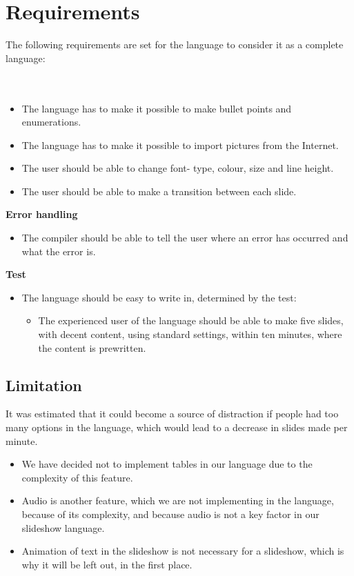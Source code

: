 \section{Requirements}
\label{LanguageRequirements}
The following requirements are set for the language to consider it as a complete language:
\\ \\
 \\
\begin{itemize}
\item The language has to make it possible to make bullet points and enumerations.
\item The language has to make it possible to import pictures from the Internet.
\item The user should be able to change font- type, colour, size and line height.
\item The user should be able to make a transition between each slide. 
\end{itemize}
\textbf{Error handling}\\
\begin{itemize}
\item The compiler should be able to tell the user where an error has occurred and what the error is.
\end{itemize}
\textbf{Test}\\
\begin{itemize}
\item The language should be easy to write in, determined by the test:
\begin{itemize}
\item The experienced user of the language should be able to make five slides, with decent content, using standard settings, within ten minutes, where the content is prewritten.
\end{itemize}
\end{itemize}

\subsection*{Limitation}
It was estimated that it could become a source of distraction if people had too many options in the language, which would lead to a decrease in slides made per minute.

\begin{itemize}
	\item We have decided not to implement tables in our language due to the complexity of this feature.
	\item Audio is another feature, which we are not implementing in the language, because of its complexity, and because audio is not a key factor in our slideshow language.
	\item Animation of text in the slideshow is not necessary for a slideshow, which is why it will be left out, in the first place.
\end{itemize}